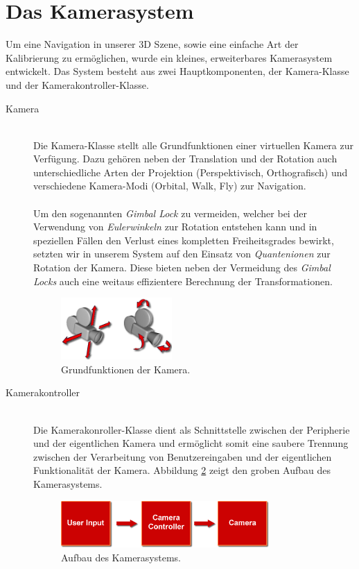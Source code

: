 \section{Das Kamerasystem}
\begin{Spacing}{\mylinespace}

Um eine Navigation in unserer 3D Szene, sowie eine einfache Art der Kalibrierung zu ermöglichen, wurde ein kleines, erweiterbares Kamerasystem entwickelt. Das System besteht aus zwei Hauptkomponenten, der Kamera-Klasse und der Kamerakontroller-Klasse.

\begin{description}
	\item[Kamera] \hfill \\
	Die Kamera-Klasse stellt alle Grundfunktionen einer virtuellen Kamera zur Verfügung. Dazu gehören neben der Translation und der Rotation auch unterschiedliche Arten der Projektion (Perspektivisch, Orthografisch) und verschiedene Kamera-Modi (Orbital, Walk, Fly) zur Navigation. \\\\
	Um den sogenannten \textit{Gimbal Lock} zu vermeiden, welcher bei der Verwendung von \textit{Eulerwinkeln} zur Rotation entstehen kann und in speziellen Fällen den Verlust eines kompletten Freiheitsgrades bewirkt, setzten wir in unserem System auf den Einsatz von \textit{Quantenionen} zur Rotation der Kamera. Diese bieten neben der Vermeidung des \textit{Gimbal Locks} auch eine weitaus effizientere Berechnung der Transformationen.   
	\begin{figure}[h!]
	\centering
	\vspace*{10px}
	\includegraphics[width=160px]{graphics/cam.png}
	\caption{Grundfunktionen der Kamera.}
	\label{fig:cam}
	\end{figure}
	\item[Kamerakontroller] \hfill \\
	Die Kamerakonroller-Klasse dient als Schnittstelle zwischen der Peripherie und der eigentlichen Kamera und ermöglicht somit eine saubere Trennung zwischen der Verarbeitung von Benutzereingaben und der eigentlichen Funktionalität der Kamera. Abbildung \ref{fig:Camerasystem} zeigt den groben Aufbau des Kamerasystems. 
	\begin{figure}[h!]
	\centering
	\vspace*{30px}
	\includegraphics[width=300px]{graphics/camcon.png}
	\caption{Aufbau des Kamerasystems.}
	\label{fig:Camerasystem}
	\end{figure}
\end{description}


\end{Spacing}
\newpage
\clearpage

